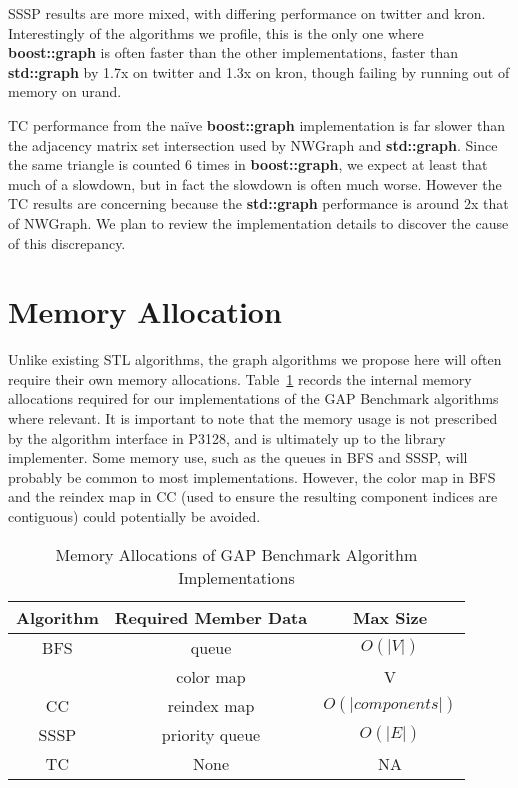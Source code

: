 SSSP results are more mixed, with differing performance on twitter and kron.
Interestingly of the algorithms we profile, this is the only one where
\textbf{boost::graph} is often faster than the other implementations,
faster than \textbf{std::graph} by 1.7x on twitter and 1.3x on kron, though
failing by running out of memory on urand.

TC performance from the na\"ive \textbf{boost::graph} implementation
is far slower than the adjacency matrix set intersection used by NWGraph
and \textbf{std::graph}.
Since the same triangle is counted 6 times in \textbf{boost::graph},
we expect at least that much of a slowdown, but in fact the slowdown
is often much worse.
However the TC results are concerning because the \textbf{std::graph}
performance is around 2x that of NWGraph.
We plan to review the implementation details to discover the cause of
this discrepancy.

\section{Memory Allocation}
Unlike existing STL algorithms, the graph algorithms we propose here
will often require their own memory allocations.
Table~\ref{tab:internalmem} records the internal memory allocations
required for our implementations of the GAP Benchmark algorithms
where relevant.
It is important to note that the memory usage is not prescribed
by the algorithm interface in P3128, and is ultimately up to the
library implementer.
Some memory use, such as the queues in BFS and SSSP, will
probably be common to most implementations.
However, the color map in BFS and the reindex map in CC
(used to ensure the resulting component indices are contiguous)
could potentially be avoided.

\begin{table}[h!]
\centering
\begin{tabular}{| c | c | c |}
\hline
Algorithm & Required Member Data & Max Size \\\hline
BFS  & queue          & $O(|V|)$ \\
     & color map      & V \\\hline
CC   & reindex map    & $O(|components|)$ \\\hline
SSSP & priority queue & $O(|E|)$\\\hline
TC   & None          & N\/A\\
\hline
\end{tabular}
\caption{Memory Allocations of GAP Benchmark Algorithm Implementations}
\label{tab:internalmem}
\end{table}
